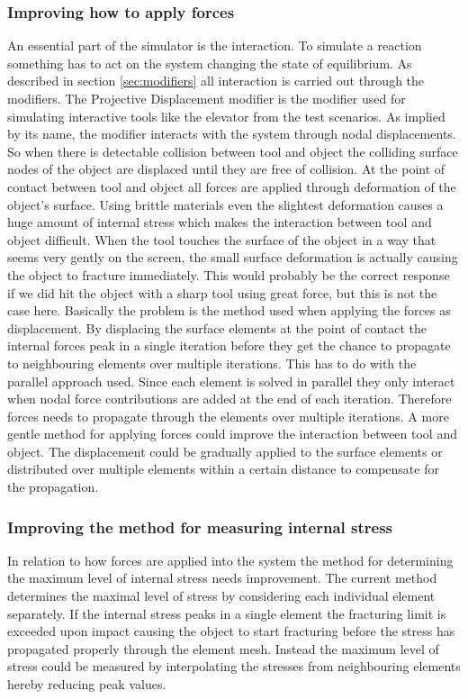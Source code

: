 \subsubsection*{Improving how to apply forces}
An essential part of the simulator is the interaction. To simulate a
reaction something has to act on the system changing the state of
equilibrium. As described in section \vref{sec:modifiers} all
interaction is carried out through the 
modifiers. The Projective Displacement modifier is the modifier used for
simulating interactive tools like the elevator from the test
scenarios. As implied by its name, the modifier interacts with the
system through nodal displacements. So when there is detectable
collision between tool and object the colliding surface nodes of the
object are displaced until they are free of collision. At the point of
contact between tool and object all forces are applied through
deformation of the object's surface. Using brittle
materials even the slightest deformation causes a huge amount of
internal stress which makes the interaction between tool and object
difficult. When the tool touches the surface of the object in a way
that seems very gently on the screen, the small surface deformation is
actually causing the object to fracture immediately. This would
probably be the correct response if we did hit the object with a sharp
tool using great force, but this is not the case here. Basically the
problem is the method used when applying the forces as
displacement. By displacing the surface elements at the
point of contact the internal forces peak in a single iteration before
they get the chance to propagate to neighbouring elements over
multiple iterations. This has to do with the parallel approach
used. Since each element is solved in parallel they only interact when
nodal force contributions are added at the end of each
iteration. Therefore forces needs to propagate through the elements
over multiple iterations.
%
A more gentle method for applying forces could improve the interaction
between tool and object. The displacement could be gradually applied
to the surface elements or distributed over multiple elements within a
certain distance to compensate for the propagation.

\subsubsection*{Improving the method for measuring internal stress}
In relation to how forces are applied into the system the method for
determining the maximum level of internal stress needs
improvement. The current method determines the maximal level of stress
by considering each individual element separately. 
%
If the internal stress peaks in a single element
the fracturing limit is exceeded upon impact
causing the object to start fracturing before the stress has
propagated properly through the element mesh. Instead the maximum
level of stress could be measured by interpolating the stresses from
neighbouring elements hereby reducing peak values. 

